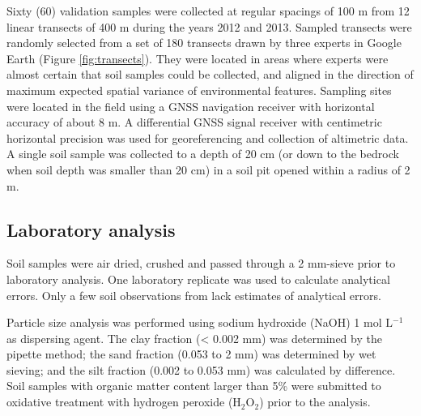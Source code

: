 Sixty (60) validation samples were collected at regular spacings of 100 m from 12 linear transects of 400 m during the years 2012 and 2013. Sampled transects were randomly selected from a set of 180 transects drawn by three experts in Google Earth (Figure \ref{fig:transects}). They were located in areas where experts were almost certain that soil samples could be collected, and aligned in the direction of maximum expected spatial variance of environmental features. Sampling sites were located in the field using a GNSS navigation receiver with horizontal accuracy of about 8 m. A differential GNSS signal receiver with centimetric horizontal precision was used for georeferencing and collection of altimetric data. A single soil sample was collected to a depth of 20 cm (or down to the bedrock when soil depth was smaller than 20 cm) in a soil pit opened within a radius of 2 m.


\tocless\subsection{Laboratory analysis}

Soil samples were air dried, crushed and passed through a 2 mm-sieve prior to laboratory analysis. One laboratory replicate was used to calculate analytical errors. Only a few soil observations from \cite{Pedron2005, MiguelEtAl2012} lack estimates of analytical errors.

Particle size analysis was performed using sodium hydroxide (NaOH) 1 mol $\text{L}{}^{-1}$ as dispersing agent. The clay fraction (< 0.002 mm) was determined by the pipette method; the sand fraction (0.053 to 2 mm) was determined by wet sieving; and the silt fraction (0.002 to 0.053 mm) was calculated by difference. Soil samples with organic matter content larger than 5\% were submitted to oxidative treatment with hydrogen peroxide ($\text{H}_{2}\text{O}_{2}$) prior to the analysis.

